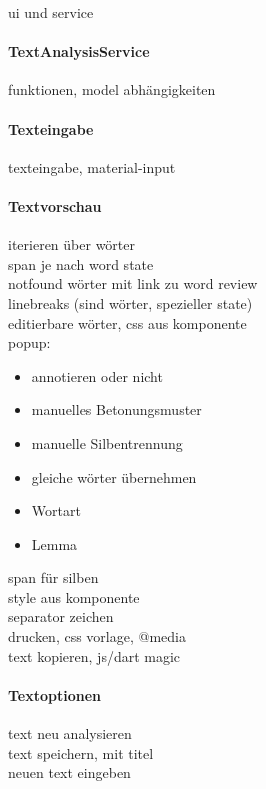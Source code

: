 ui und service

\paragraph{TextAnalysisService}

funktionen, model abhängigkeiten

\paragraph{Texteingabe}

texteingabe, material-input\\

\paragraph{Textvorschau}

iterieren über wörter\\
span je nach word state\\
notfound wörter mit link zu word review\\
linebreaks (sind wörter, spezieller state)\\

editierbare wörter, css aus komponente\\
popup:\\
\begin{itemize}
	\item annotieren oder nicht
	\item manuelles Betonungsmuster
	\item manuelle Silbentrennung
	\item gleiche wörter übernehmen
	\item Wortart
	\item Lemma
\end{itemize}

span für silben\\
style aus komponente\\
separator zeichen\\

drucken, css vorlage, @media\\
text kopieren, js/dart magic\\

\paragraph{Textoptionen}

text neu analysieren\\
text speichern, mit titel\\
neuen text eingeben

